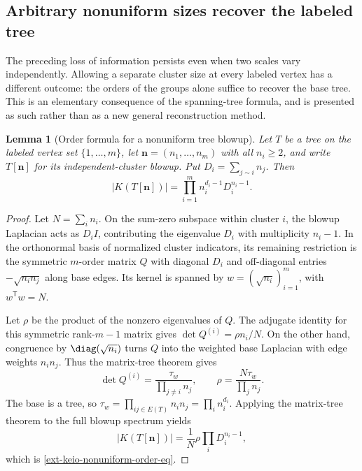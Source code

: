 \documentclass[11pt,a4paper]{article}
\newtheorem{lemma}[theorem]{Lemma}
\theoremstyle{definition}\newtheorem{definition}[theorem]{Definition}
\theoremstyle{remark}\newtheorem{remark}[theorem]{Remark}
\numberwithin{equation}{section}
\begin{document}
\subsection{Arbitrary nonuniform sizes recover the labeled tree}

The preceding loss of information persists even when two scales vary
independently.  Allowing a separate cluster size at every labeled vertex has
a different outcome: the orders of the groups alone suffice to recover the
base tree.  This is an elementary consequence of the spanning-tree formula,
and is presented as such rather than as a new general reconstruction method.

\begin{lemma}[Order formula for a nonuniform tree blowup]
\label{ext-keio-nonuniform-order}
Let $T$ be a tree on the labeled vertex set $\{1,\ldots,m\}$, let
$\mathbf n=(n_1,\ldots,n_m)$ with all $n_i\geq2$, and write
$T[\mathbf n]$ for its independent-cluster blowup.  Put
$D_i=\sum_{j\sim i}n_j$.  Then
\begin{equation}
 |K(T[\mathbf n])|
 =\prod_{i=1}^m n_i^{d_i-1}D_i^{n_i-1}.                    \label{ext-keio-nonuniform-order-eq}
\end{equation}
\end{lemma}

\begin{proof}
Let $N=\sum_i n_i$.  On the sum-zero subspace within cluster $i$, the
blowup Laplacian acts as $D_iI$, contributing the eigenvalue $D_i$ with
multiplicity $n_i-1$.  In the orthonormal basis of normalized cluster
indicators, its remaining restriction is the symmetric $m$-order matrix
$Q$ with diagonal $D_i$ and off-diagonal entries $-\sqrt{n_i n_j}$ along
base edges.  Its kernel is spanned by
$w=(\sqrt{n_i})_{i=1}^m$, with $w^{\mathsf T}w=N$.

Let $\rho$ be the product of the nonzero eigenvalues of $Q$.  The adjugate
identity for this symmetric rank-$m-1$ matrix gives
$\det Q^{(i)}=\rho n_i/N$.  On the other hand, congruence by
$\diag(\sqrt{n_i})$ turns $Q$ into the weighted base Laplacian with edge
weights $n_i n_j$.  Thus the matrix-tree theorem gives
\[
 \det Q^{(i)}=\frac{\tau_w}{\prod_{j\ne i}n_j},\qquad
 \rho=\frac{N\tau_w}{\prod_j n_j}.
\]
The base is a tree, so
$\tau_w=\prod_{ij\in E(T)}n_i n_j=\prod_i n_i^{d_i}$.
Applying the matrix-tree theorem to the full blowup spectrum yields
\[
 |K(T[\mathbf n])|=\frac{1}{N}\rho\prod_iD_i^{n_i-1},
\]
which is \eqref{ext-keio-nonuniform-order-eq}.
\end{proof}
\end{document}
